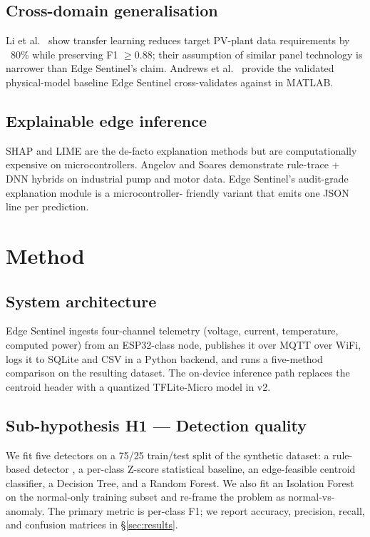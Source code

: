\documentclass[12pt,journal,onecolumn]{IEEEtran}
\begin{document}
\subsection{Cross-domain generalisation}

Li et al.\ \cite{li2022transfer} show transfer learning reduces target
PV-plant data requirements by ~80\% while preserving F1 $\geq 0.88$;
their assumption of similar panel technology is narrower than Edge
Sentinel's claim. Andrews et al.\ \cite{andrews2021pvlib} provide the
validated physical-model baseline Edge Sentinel cross-validates against
in MATLAB.

\subsection{Explainable edge inference}

SHAP \cite{lundberg2017unified} and LIME \cite{ribeiro2016why} are the
de-facto explanation methods but are computationally expensive on
microcontrollers. Angelov and Soares \cite{angelov2021explainable}
demonstrate rule-trace + DNN hybrids on industrial pump and motor data.
Edge Sentinel's audit-grade explanation module is a microcontroller-
friendly variant that emits one JSON line per prediction.

\section{Method}
\label{sec:method}

\subsection{System architecture}

Edge Sentinel ingests four-channel telemetry (voltage, current,
temperature, computed power) from an ESP32-class node, publishes it
over MQTT over WiFi, logs it to SQLite and CSV in a Python backend,
and runs a five-method comparison on the resulting dataset. The
on-device inference path replaces the centroid header with a quantized
TFLite-Micro model in v2.

\subsection{Sub-hypothesis H1 --- Detection quality}

We fit five detectors on a 75/25 train/test split of the synthetic
dataset: a rule-based detector \cite{edge_sentinel_repo}, a per-class
Z-score statistical baseline, an edge-feasible centroid classifier, a
Decision Tree, and a Random Forest. We also fit an Isolation Forest on
the normal-only training subset and re-frame the problem as
normal-vs-anomaly. The primary metric is per-class F1; we report
accuracy, precision, recall, and confusion matrices in
\S\ref{sec:results}.
\end{document}
